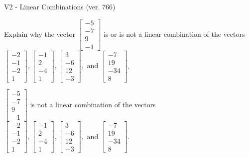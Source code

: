 \begin{exercise}
  \begin{exerciseTitle}V2 - Linear Combinations (ver. 766)\end{exerciseTitle}
  \begin{exerciseStatement}
    Explain why the vector \(\left[\begin{array}{c}
-5 \\
-7 \\
9 \\
-1
\end{array}\right]\)  is or is not a linear 
	combination of the vectors \(\left[\begin{array}{c}
-2 \\
-1 \\
-2 \\
1
\end{array}\right] , \left[\begin{array}{c}
-1 \\
2 \\
-4 \\
1
\end{array}\right] , \left[\begin{array}{c}
3 \\
-6 \\
12 \\
-3
\end{array}\right] , \text{ and } \left[\begin{array}{c}
-7 \\
19 \\
-34 \\
8
\end{array}\right]\).
	


  \end{exerciseStatement}
  \begin{exerciseAnswer}
   \(\left[\begin{array}{c}
-5 \\
-7 \\
9 \\
-1
\end{array}\right]\) 
  	 is not  
	a linear combination of the vectors \(\left[\begin{array}{c}
-2 \\
-1 \\
-2 \\
1
\end{array}\right] , \left[\begin{array}{c}
-1 \\
2 \\
-4 \\
1
\end{array}\right] , \left[\begin{array}{c}
3 \\
-6 \\
12 \\
-3
\end{array}\right] , \text{ and } \left[\begin{array}{c}
-7 \\
19 \\
-34 \\
8
\end{array}\right]\).


\end{exerciseAnswer}
\end{exercise}
